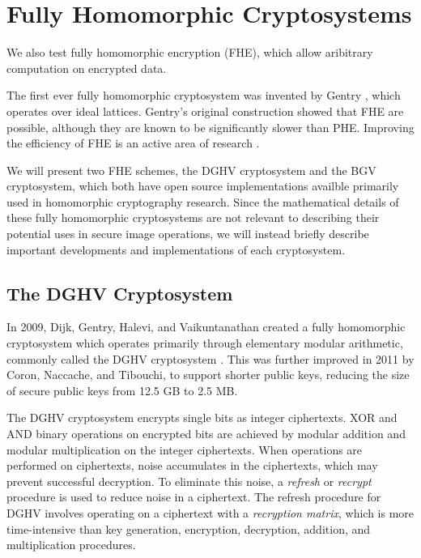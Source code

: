 \section{Fully Homomorphic Cryptosystems}

We also test fully homomorphic encryption (FHE), which allow aribitrary computation on encrypted data.

The first ever fully homomorphic cryptosystem was invented by Gentry \cite{gentry_fully_2009}, which operates over ideal lattices. Gentry's original construction showed that FHE are possible, although they are known to be significantly slower than PHE.
Improving the efficiency of FHE is an active area of research \cite{sen_homomorphic_2013}.

We will present two FHE schemes, the DGHV cryptosystem and the BGV cryptosystem, which both have open source implementations availble primarily used in homomorphic cryptography research. Since the mathematical details of these fully homomorphic cryptosystems are not relevant to describing their potential uses in secure image operations, we will instead briefly describe important developments and implementations of each cryptosystem.

\subsection{The DGHV Cryptosystem}
In 2009, Dijk, Gentry, Halevi, and Vaikuntanathan created a fully homomorphic cryptosystem which operates primarily through elementary modular arithmetic, commonly called the DGHV cryptosystem \cite{cryptoeprint:2009:616}. This was further improved in 2011 by Coron, Naccache, and Tibouchi, \cite{cryptoeprint:2011:277, cryptoeprint:2011:440} to support shorter public keys, reducing the size of secure public keys from 12.5 GB to 2.5 MB.

The DGHV cryptosystem encrypts single bits as integer ciphertexts. XOR and AND binary operations on encrypted bits are achieved by modular addition and modular multiplication on the integer ciphertexts. When operations are performed on ciphertexts, noise accumulates in the ciphertexts, which may prevent successful decryption. To eliminate this noise, a \textit{refresh} or \textit{recrypt} procedure is used to reduce noise in a ciphertext. The refresh procedure for DGHV involves operating on a ciphertext with a \textit{recryption matrix}, which is more time-intensive than key generation, encryption, decryption, addition, and multiplication procedures.

